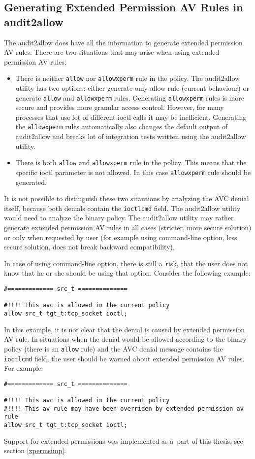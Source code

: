 \subsection{Generating Extended Permission AV Rules in audit2allow}
The audit2allow does have all the information to generate extended permission AV
rules. There are two situations that may arise when using extended permission AV
rules:
\begin{itemize}
    \item There is neither \texttt{allow} nor \texttt{allowxperm} rule in the
        policy. The audit2allow utility has two options: either generate only
        allow rule (current behaviour) or generate \texttt{allow} and
        \texttt{allowxperm} rules. Generating \texttt{allowxperm} rules is more
        secure and provides more granular access control. However, for many
        processes that use lot of different ioctl calls it may be inefficient.
        Generating the \texttt{allowxperm} rules automatically also changes the
        default output of audit2allow and breaks lot of integration tests
        written using the audit2allow utility.
    \item There is both \texttt{allow} and \texttt{allowxperm} rule in the
        policy. This means that the specific ioctl parameter is not allowed. In
        this case \texttt{allowxperm} rule should be generated.
\end{itemize}

It is not possible to distinguish these two sitautions by analyzing the AVC
denial itself, because both denials contain the \texttt{ioctlcmd} field. The
audit2allow utility would need to analyze the binary policy. The audit2allow
utility may rather generate extended permission AV rules in all cases (stricter,
more secure solution) or only when requested by user (for example using
command-line option, less secure solution, does not break backward
compatibility).

In case of using command-line option, there is still a~risk, that the user does
not know that he or she should be using that option. Consider the following
example:
\begin{lstlisting}
#============= src_t ==============

#!!!! This avc is allowed in the current policy
allow src_t tgt_t:tcp_socket ioctl;
\end{lstlisting}
In this example, it is not clear that the denial is caused by extended
permission AV rule. In situations when the denial would be allowed according to
the binary policy (there is an \texttt{allow} rule) and the AVC denial message
contains the \texttt{ioctlcmd} field, the user should be warned about extended
permission AV rules. For example:
\begin{lstlisting}
#============= src_t ==============

#!!!! This avc is allowed in the current policy
#!!!! This av rule may have been overriden by extended permission av rule
allow src_t tgt_t:tcp_socket ioctl;
\end{lstlisting}
Support for extended permissions was implemented as a~part of this thesis, see
section \ref{xpermsimp}.

